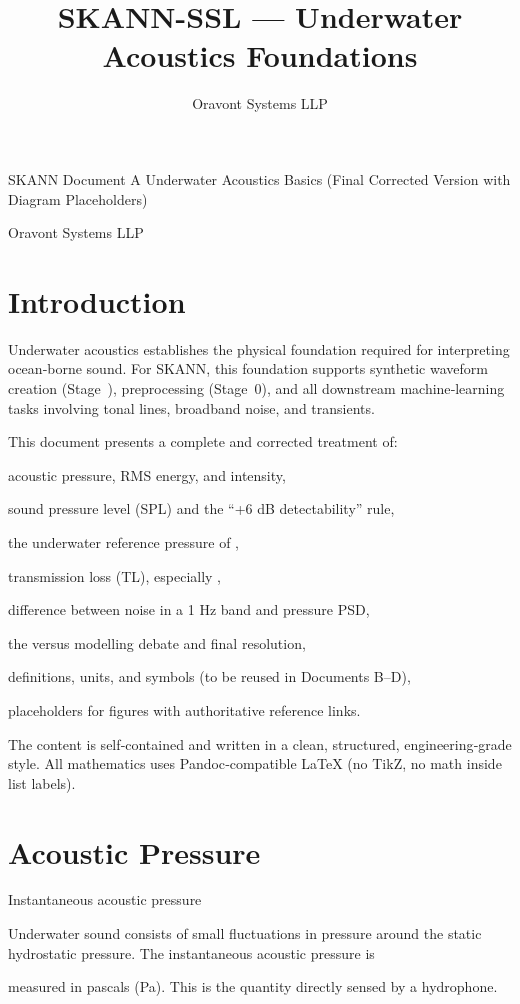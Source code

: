 \documentclass[12pt]{article}
\begin{document}
\title{SKANN-SSL --- Underwater Acoustics Foundations}
\author{Oravont Systems LLP}
\date{}
\maketitle

SKANN Document A
Underwater Acoustics Basics
(Final Corrected Version with Diagram Placeholders)

Oravont Systems LLP

\section*{Introduction}
Underwater acoustics establishes the physical foundation required for interpreting ocean‐borne sound. For SKANN, this foundation supports synthetic waveform creation (Stage ), preprocessing (Stage 0), and all downstream machine‐learning tasks involving tonal lines, broadband noise, and transients.

This document presents a complete and corrected treatment of:

acoustic pressure, RMS energy, and intensity,

sound pressure level (SPL) and the “+6 dB detectability” rule,

the underwater reference pressure of ,

transmission loss (TL), especially ,

difference between noise in a 1 Hz band and pressure PSD,

the  versus  modelling debate and final resolution,

definitions, units, and symbols (to be reused in Documents B–D),

placeholders for figures with authoritative reference links.

The content is self‐contained and written in a clean, structured, engineering‐grade style. All mathematics uses Pandoc‐compatible LaTeX (no TikZ, no math inside list labels).

\section*{Acoustic Pressure}
Instantaneous acoustic pressure

Underwater sound consists of small fluctuations in pressure around the static hydrostatic pressure. The instantaneous acoustic pressure is


measured in pascals (Pa). This is the quantity directly sensed by a hydrophone.
\end{document}

